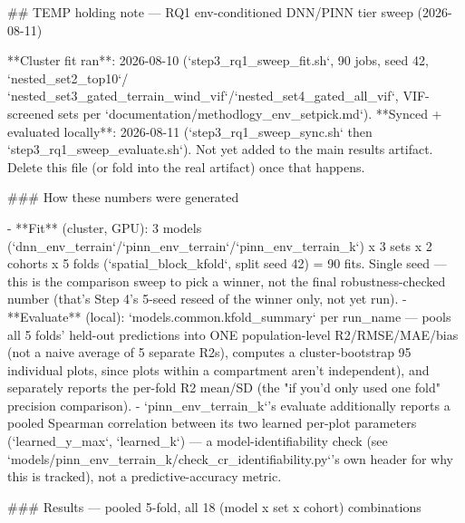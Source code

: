 ## TEMP holding note — RQ1 env-conditioned DNN/PINN tier sweep (2026-08-11)

**Cluster fit ran**: 2026-08-10 (`step3_rq1_sweep_fit.sh`, 90 jobs, seed 42, `nested_set2_top10`/
`nested_set3_gated_terrain_wind_vif`/`nested_set4_gated_all_vif`, VIF-screened sets per
`documentation/methodlogy_env_setpick.md`). **Synced + evaluated locally**: 2026-08-11
(`step3_rq1_sweep_sync.sh` then `step3_rq1_sweep_evaluate.sh`). Not yet added to the main results
artifact. Delete this file (or fold into the real artifact) once that happens.

### How these numbers were generated

- **Fit** (cluster, GPU): 3 models (`dnn_env_terrain`/`pinn_env_terrain`/`pinn_env_terrain_k`) x
  3 sets x 2 cohorts x 5 folds (`spatial_block_kfold`, split seed 42) = 90 fits. Single seed —
  this is the comparison sweep to pick a winner, not the final robustness-checked number (that's
  Step 4's 5-seed reseed of the winner only, not yet run).
- **Evaluate** (local): `models.common.kfold_summary` per run_name — pools all 5 folds' held-out
  predictions into ONE population-level R2/RMSE/MAE/bias (not a naive average of 5 separate R2s),
  computes a cluster-bootstrap 95%
  individual plots, since plots within a compartment aren't independent), and separately reports
  the per-fold R2 mean/SD (the "if you'd only used one fold" precision comparison).
- `pinn_env_terrain_k`'s evaluate additionally reports a pooled Spearman correlation between its
  two learned per-plot parameters (`learned_y_max`, `learned_k`) — a model-identifiability check
  (see `models/pinn_env_terrain_k/check_cr_identifiability.py`'s own header for why this is
  tracked), not a predictive-accuracy metric.

### Results — pooled 5-fold, all 18 (model x set x cohort) combinations

